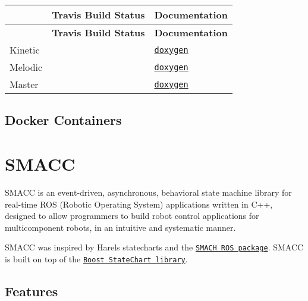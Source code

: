 \tabulinesep=1mm
\begin{longtabu} spread 0pt [c]{*3{|X[-1]}|}
\hline
{}&{\bf Travis Build Status }&{\bf Documentation  }\\
\endfirsthead
\hline
\endfoot
\hline
{}&{\bf Travis Build Status }&{\bf Documentation  }\\
\endhead
Kinetic & &\href{https://reelrbtx.github.io/SMACC_Documentation/kinetic-devel/html/namespaces.html}{\tt doxygen} \\
Melodic & &\href{https://reelrbtx.github.io/SMACC_Documentation/melodic-devel/html/namespaces.html}{\tt doxygen} \\
Master & &\href{https://reelrbtx.github.io/SMACC_Documentation/master/html/namespaces.html}{\tt doxygen} \\
\end{longtabu}


\subsection*{Docker Containers}

\href{https://hub.docker.com/r/pabloinigoblasco/smacc/}{\tt } \href{https://hub.docker.com/r/pabloinigoblasco/smacc/}{\tt } \href{https://registry.hub.docker.com/pabloinigoblasco/smacc/}{\tt }

\section*{S\+M\+A\+CC}

S\+M\+A\+CC is an event-\/driven, asynchronous, behavioral state machine library for real-\/time R\+OS (Robotic Operating System) applications written in C++, designed to allow programmers to build robot control applications for multicomponent robots, in an intuitive and systematic manner.

S\+M\+A\+CC was inspired by Harel\textquotesingle{}s statecharts and the \href{http://wiki.ros.org/smach}{\tt S\+M\+A\+CH R\+OS package}. S\+M\+A\+CC is built on top of the \href{https://www.boost.org/doc/libs/1_53_0/libs/statechart/doc/index.html}{\tt Boost State\+Chart library}.

\subsection*{Features}



